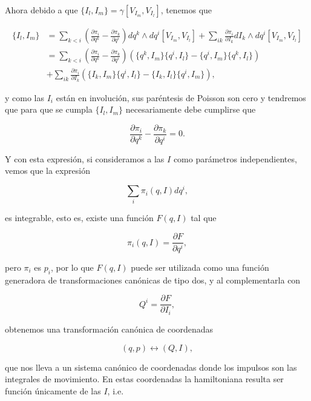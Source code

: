 \documentclass[a4paper,10pt]{article}
\numberwithin{equation}{section}
\begin{document}
Ahora debido a que $\{I_l, I_m\} = \gamma[V_{I_m},V_{I_l}]$, tenemos que 

\begin{align*}
\{I_l, I_m\} &= \sum_{k<i} \left(\frac{\partial \pi_i}{\partial q^k} - 
 \frac{\partial \pi_k}{\partial q^i}\right) dq^k \wedge dq^i[V_{I_m},V_{I_l}] + 
 \sum_{ik} \frac{\partial \pi_i}{\partial I_k} dI_k \wedge dq^i[V_{I_m},V_{I_l}] \\
 &= \sum_{k<i} \left(\frac{\partial \pi_i}{\partial q^k} - 
 \frac{\partial \pi_k}{\partial q^i}\right)(\{q^k,I_m\}\{q^i,I_l\} - 
 \{q^i,I_m\}\{q^k,I_l\}) \\  
 &+ \sum_{ik} \frac{\partial \pi_i}{\partial I_k}
 (\{I_k,I_m\}\{q^i,I_l\} - \{I_k,I_l\}\{q^i,I_m\}),
\end{align*}

y como las $I_i$ están en involución, sus paréntesis de Poisson son cero 
y tendremos que para que se cumpla $\{I_l,I_m\}$ necesariamente debe cumplirse 
que 

\begin{equation}
 \frac{\partial \pi_i}{\partial q^k} - \frac{\partial \pi_k}{\partial q^i} = 0.
\end{equation}

Y con esta expresión, si consideramos a las $I$ como parámetros independientes, 
vemos que la expresión 

\begin{equation}
 \sum_i \pi_i(q,I)dq^i,
\end{equation}

es integrable, esto es, existe una función $F(q,I)$ tal que 

\begin{equation}
 \pi_i(q,I) = \frac{\partial F}{\partial q^i},
\end{equation}

pero $\pi_i$ es $p_i$, por lo que $F(q,I)$ puede ser utilizada como una función 
generadora de transformaciones canónicas de tipo dos, y al complementarla con 

\begin{equation}
 Q^i = \frac{\partial F}{\partial I_i},
\end{equation}

obtenemos una transformación canónica de coordenadas 

\begin{equation}
 (q,p) \leftrightarrow (Q,I),
\end{equation}

que nos lleva a un sistema canónico de coordenadas donde los impulsos son las 
integrales de movimiento. En estas coordenadas la hamiltoniana resulta ser función 
únicamente de las $I$, i.e.
\end{document}
